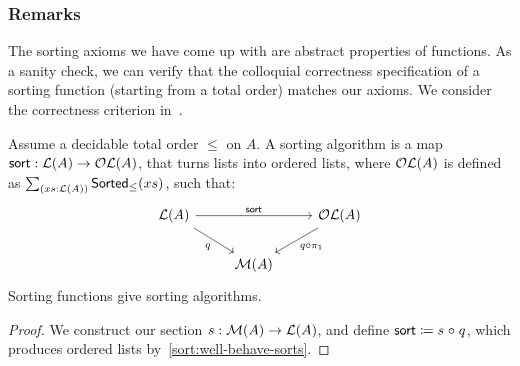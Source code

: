 \subsubsection*{Remarks}

The sorting axioms we have come up with are abstract properties of functions.
%
As a sanity check, we can verify that the colloquial correctness specification of a sorting function (starting from a
total order) matches our axioms. We consider the correctness criterion in~\cite{alexandruIntrinsicallyCorrectSorting2023}.
%
\begin{proposition}
    \label{prop:sort-correctness}
    Assume a decidable total order $\leq$ on $A$.
    A sorting algorithm is a map $\operatorname{\mathsf{sort}} : {\mathcal{L}(A) \to \mathcal{OL}(A)}$,
    that turns lists into ordered lists,
    where $\mathcal{OL}(A)$ is defined as $\dsum{xs : \LL(A)}{\term{Sorted}_{\leq}(xs)}$,
    such that:
    \[\begin{tikzcd}
            {\LL(A)} && {\OLL(A)} \\
            & {\MM(A)}
            \arrow["{\term{sort}}", from=1-1, to=1-3]
            \arrow["q"', from=1-1, to=2-2]
            \arrow["{q \comp \pi_1}", from=1-3, to=2-2]
        \end{tikzcd}\]
    Sorting functions give sorting algorithms.
\end{proposition}
\begin{proof}
    We construct our section $s:\mathcal{M}(A) \to \mathcal{L}(A)$,
    and define $\operatorname{\mathsf{sort}} \mathrel{\coloneq} s \mathrel{\circ} q$,
    which produces ordered lists by~\cref{sort:well-behave-sorts}.
\end{proof}
